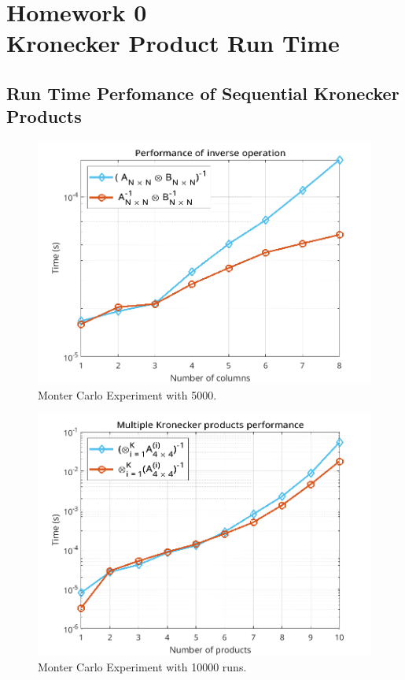 \documentclass[a4paper,10pt]{article}
\begin{document}

\thispagestyle{empty}

\newpage

\thispagestyle{empty}

\newpage
\section*{Homework 0 \\ Kronecker Product Run Time}

    \subsection*{Run Time Perfomance of Sequential Kronecker Products}

    \begin{figure}[ht!]
        \centering 
        \includegraphics[width=0.75\linewidth]{figs/hw0a1.png} \par 
        \caption{Monter Carlo Experiment with 5000.}
        \label{fig:hw0a1} 
    \end{figure}

    \begin{figure}[ht!]
        \centering 
        \includegraphics[width=0.75\linewidth]{figs/hw0a2.png} \par 
        \caption{Monter Carlo Experiment with 10000 runs.}
        \label{fig:hw0a2} 
    \end{figure}
\end{document}

